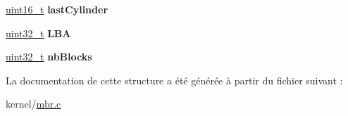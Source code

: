 \begin{DoxyCompactItemize}
\item 
\hypertarget{struct__PartitionDescriptor_ae41ef6da9ade744a36f58a1e5ece36f7}{\hyperlink{types_8h_adf4d876453337156dde61095e1f20223}{uint16\-\_\-t} {\bfseries last\-Cylinder}}\label{struct__PartitionDescriptor_ae41ef6da9ade744a36f58a1e5ece36f7}

\item 
\hypertarget{struct__PartitionDescriptor_ae0a54b137da361739f30ce3a33f46379}{\hyperlink{types_8h_a33594304e786b158f3fb30289278f5af}{uint32\-\_\-t} {\bfseries L\-B\-A}}\label{struct__PartitionDescriptor_ae0a54b137da361739f30ce3a33f46379}

\item 
\hypertarget{struct__PartitionDescriptor_a48615506f84f0b810db3d15fbcbbfe2f}{\hyperlink{types_8h_a33594304e786b158f3fb30289278f5af}{uint32\-\_\-t} {\bfseries nb\-Blocks}}\label{struct__PartitionDescriptor_a48615506f84f0b810db3d15fbcbbfe2f}

\end{DoxyCompactItemize}


La documentation de cette structure a été générée à partir du fichier suivant \-:\begin{DoxyCompactItemize}
\item 
kernel/\hyperlink{mbr_8c}{mbr.\-c}\end{DoxyCompactItemize}
